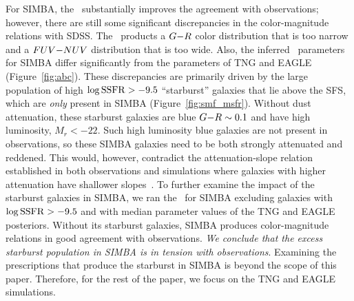 For SIMBA, the \eda~substantially improves the agreement with observations;
however, there are still some significant discrepancies in the color-magnitude
relations with SDSS. The \eda~products a $G{-}R$ color distribution that is too
narrow and a $FUV{-}NUV$ distribution that is too wide. Also, the inferred \eda~parameters 
for SIMBA differ significantly from the parameters of TNG and EAGLE
(Figure~\ref{fig:abc}). These discrepancies are primarily driven by the
large population of high $\log{\rm SSFR} > -9.5$ ``starburst'' galaxies that
lie above the SFS, which are {\em only} present in SIMBA (Figure~\ref{fig:smf_msfr}). 
Without dust attenuation, these starburst galaxies are blue $G{-}R\sim0.1$ and
have high luminosity, $M_r < -22$. Such high luminosity blue galaxies are not
present in observations, so these SIMBA galaxies need to be both strongly 
attenuated and reddened. This would, however, contradict the attenuation-slope 
relation established in both observations and simulations where galaxies with 
higher attenuation have shallower
slopes~\citep{inoue2005,chevallard2013,salim2018,salim2020,trayford2020}.
To further examine the impact of the starburst galaxies in SIMBA, we ran the \eda~for SIMBA excluding galaxies with $\log{\rm SSFR} > -9.5$ and 
with median parameter values of the TNG and EAGLE posteriors. Without its starburst
galaxies, SIMBA produces color-magnitude relations in good agreement 
with observations. {\em We conclude that the excess starburst population in 
SIMBA is in tension with observations}. Examining the prescriptions that
produce the starburst in SIMBA is beyond the scope of this paper. Therefore,
for the rest of the paper, we focus on the TNG and EAGLE simulations.  

